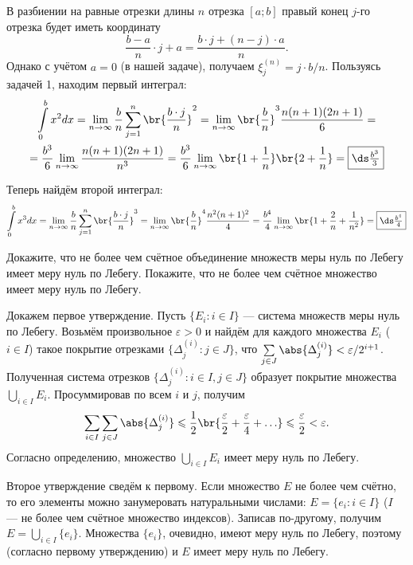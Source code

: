 \begin{solution}
    В разбиении на равные отрезки длины $n$ отрезка $[a; b]$ правый конец $j$-го отрезка будет иметь координату
    \[
        \frac{b - a}{n} \cdot j + a = \frac{b \cdot j + (n - j) \cdot a}{n}.
    \]
    Однако с учётом $a = 0$ (в нашей задаче), получаем $\xi_j^{(n)} = j \cdot b / n$. Пользуясь задачей 1, находим первый интеграл:
    \begin{multline*}
        \int\limits_0^bx^2dx = \lim_{n \to \infty}\frac{b}{n}\sum_{j = 1}^n\br{\frac{b \cdot j}{n}}^2 = \lim_{n \to \infty}\br{\frac{b}{n}}^3\frac{n(n + 1)(2n + 1)}{6} =\\ =\frac{b^3}{6}\lim_{n \to \infty}\frac{n(n + 1)(2n + 1)}{n^3} = \frac{b^3}{6}\lim_{n \to \infty}\br{1 + \frac{1}{n}}\br{2 + \frac{1}{n}} = \fbox{$\ds\frac{b^3}{3}$}
    \end{multline*}

    Теперь найдём второй интеграл:
    \[
        \int\limits_0^bx^3dx = \lim_{n \to \infty}\frac{b}{n}\sum_{j = 1}^n\br{\frac{b \cdot j}{n}}^3 = \lim_{n \to \infty}\br{\frac{b}{n}}^4\frac{n^2(n + 1)^2}{4} = \frac{b^4}{4}\lim_{n \to \infty}\br{1 + \frac{2}{n} + \frac{1}{n^2}} = \fbox{$\ds\frac{b^4}{4}$}
    \]
\end{solution}

\begin{problem}[4$^\circ$]
    Докажите, что не более чем счётное объединение множеств меры нуль по Лебегу имеет меру нуль по Лебегу. Покажите, что не более чем счётное множество имеет меру нуль по Лебегу.
\end{problem}

\begin{solution}
    Докажем первое утверждение. Пусть $\{E_i : i \in I\}$ --- система множеств меры нуль по Лебегу. Возьмём произвольное $\varepsilon > 0$ и найдём для каждого множества $E_i$ ($i \in I$) такое покрытие отрезками $\{\Delta^{(i)}_j : j \in J\}$, что $\sum\limits_{j \in J}\abs{\Delta^{(i)}_j} < \varepsilon / 2^{i + 1}$. Полученная система отрезков $\{\Delta^{(i)}_j : i \in I, j \in J\}$ образует покрытие множества $\bigcup\limits_{i \in I}E_i$. Просуммировав по всем $i$ и $j$, получим
    \[
        \sum_{i \in I}\sum_{j \in J}\abs{\Delta^{(i)}_j} \leqslant \frac{1}{2}\br{\frac{\varepsilon}{2} + \frac{\varepsilon}{4} + \ldots} \leqslant \frac{\varepsilon}{2} < \varepsilon.
    \]
    Согласно определению, множество $\bigcup\limits_{i \in I}E_i$ имеет меру нуль по Лебегу.

    Второе утверждение сведём к первому. Если множество $E$ не более чем счётно, то его элементы можно занумеровать натуральными числами: $E = \{e_i : i \in I\}$ ($I$ --- не более чем счётное множество индексов). Записав по-другому, получим $E = \bigcup\limits_{i \in I}\{e_i\}$. Множества $\{e_i\}$, очевидно, имеют меру нуль по Лебегу, поэтому (согласно первому утверждению) и $E$ имеет меру нуль по Лебегу.
\end{solution}

